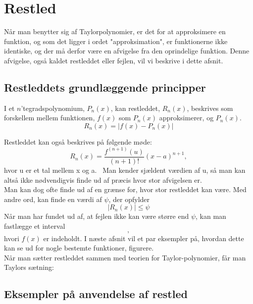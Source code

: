 \chapter{Restled}

Når man benytter sig af Taylorpolynomier, er det for at approksimere en funktion, og som det ligger i ordet "approksimation", er funktionerne ikke identiske, og der må derfor være en afvigelse fra den oprindelige funktion. Denne afvigelse, også kaldet restleddet eller fejlen, vil vi beskrive i dette afsnit.

\section{Restleddets grundlæggende principper}
\begin{defn}
	I et $n$'tegradspolynomium, $P_n(x)$, kan restleddet, $R_n(x)$, beskrives som 			forskellem mellem funktionen, $f(x)$ som $P_n(x)$ approksimerer, og 		$P_n(x)$.\
	\begin{equation*}
		R_n(x)=|f(x)-P_n(x)|
	\end{equation*}
\end{defn}
Restleddet kan også beskrives på følgende møde:
\begin{equation}
	R_n(x)=\frac{f^{(n+1)}(u)}{(n+1)!}(x-a)^{n+1},
\end{equation}
hvor u er et tal mellem x og a. %
\
Man kender sjældent værdien af u, så man kan altså ikke nødvendigvis finde ud af præcis hvor stor afvigelsen er.\\
Man kan dog ofte finde ud af en grænse for, hvor stor restleddet kan være. Med andre ord, kan finde en værdi af $\psi$, der opfylder
\begin{equation}
	|R_n(x)|\leq \psi
\end{equation}
Når man har fundet ud af, at fejlen ikke kan være større end $\psi$, kan man fastlægge et interval 
\begin{equation*}
[P_n(x)-\psi,P_n(x)+\psi],
\end{equation*}
hvori $f(x)$ er indeholdt. I næste afsnit vil et par eksempler på, hvordan dette kan se ud for nogle bestemte funktioner, figurere.\\
Når man sætter restleddet sammen med teorien for Taylor-polynomier, får man Taylors sætning:


\section{Eksempler på anvendelse af restled}
